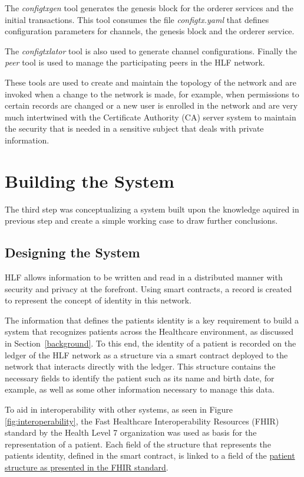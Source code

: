 The \textit{configtxgen} tool generates the genesis block for the orderer
services and the initial transactions.  This tool consumes the file
\textit{configtx.yaml} that defines configuration parameters for channels, the
genesis block and the orderer service.

The \textit{configtxlator} tool is also used to generate channel
configurations.  Finally the \textit{peer} tool is used to manage the
participating peers in the HLF network.

These tools are used to create and maintain the topology of the network and are
invoked when a change to the network is made, for example, when permissions to
certain records are changed or a new user is enrolled in the network and are
very much intertwined with the Certificate Authority (CA) server system to
maintain the security that is needed in a sensitive subject that deals with
private information.

\section{Building the System}

The third step was conceptualizing a system built upon the knowledge aquired in
previous step and create a simple working case to draw further conclusions.

\subsection{Designing the System}

HLF allows information to be written and read in a distributed manner with
security and privacy at the forefront. Using smart contracts, a record is
created to represent the concept of identity in this network.

The information that defines the patients identity is a key requirement to
build a system that recognizes patients across the Healthcare environment, as
discussed in Section~\ref{background}.  To this end, the identity of a patient
is recorded on the ledger of the HLF network as a structure via a smart
contract deployed to the network that interacts directly with the ledger.  This
structure contains the necessary fields to identify the patient such as its
name and birth date, for example, as well as some other information necessary
to manage this data. 

To aid in interoperability with other systems, as seen in Figure
\ref{fig:interoperability}, the Fast Healthcare Interoperability Resources
(FHIR) standard by the Health Level 7 organization was used as basis for the
representation of a patient.  Each field of the structure that represents the
patients identity, defined in the smart contract, is linked to a field of the
\href{http://www.hl7.org/fhir/patient.html}{patient structure as presented in
the FHIR standard}.

